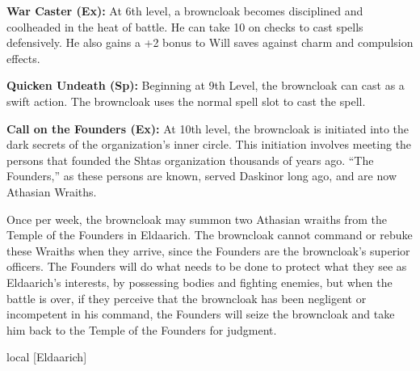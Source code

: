 {\textbf{War Caster (Ex):} At 6th level, a browncloak becomes disciplined and coolheaded in the heat of battle. He can take 10 on  checks to cast spells defensively. He also gains a +2 bonus to Will saves against charm and compulsion effects.

\textbf{Quicken Undeath (Sp):} Beginning at 9th Level, the browncloak can cast  as a swift action. The browncloak uses the normal spell slot to cast the spell.

\textbf{Call on the Founders (Ex):} At 10th level, the browncloak is initiated into the dark secrets of the organization's inner circle. This initiation involves meeting the persons that founded the Shtas organization thousands of years ago. ``The Founders,'' as these persons are known, served Daskinor long ago, and are now Athasian Wraiths.

Once per week, the browncloak may summon two Athasian wraiths from the Temple of the Founders in Eldaarich. The browncloak cannot command or rebuke these Wraiths when they arrive, since the Founders are the browncloak's superior officers. The Founders will do what needs to be done to protect what they see as Eldaarich's interests, by possessing bodies and fighting enemies, but when the battle is over, if they perceive that the browncloak has been negligent or incompetent in his command, the Founders will seize the browncloak and take him back to the Temple of the Founders for judgment.
}
{}
{local [Eldaarich]}
{}
{}
{}